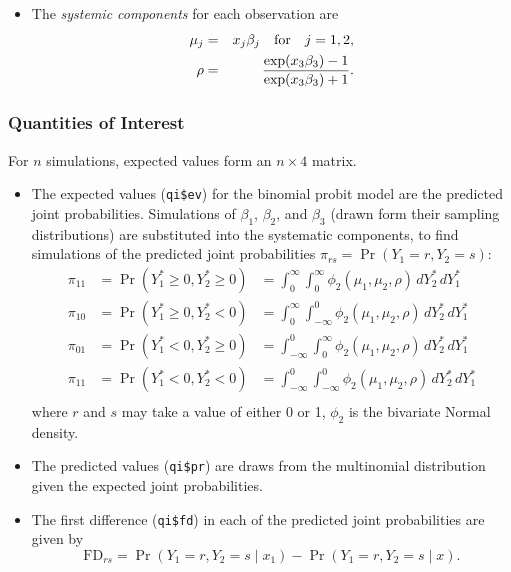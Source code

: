 \documentclass{article}
\begin{document}
\begin{itemize}
\item The \emph{systemic components} for each observation are 
  \begin{eqnarray*}
    \mu_j & = & x_{j} \beta_j \quad {\rm for} \quad j=1,2, \\
    \rho & = & \frac{\exp(x_3 \beta_3) - 1}{\exp(x_3 \beta_3) + 1}.
\end{eqnarray*}

\end{itemize}

\subsubsection{Quantities of Interest}
For $n$ simulations, expected values form an $n \times 4$
matrix.  
\begin{itemize}
\item The expected values ({\tt qi\$ev}) for the binomial probit model
  are the predicted joint probabilities. Simulations of $\beta_1$,
  $\beta_2$, and $\beta_3$ (drawn form their sampling distributions)
  are substituted into the systematic components, to find simulations
  of the predicted joint probabilities $\pi_{rs}=\Pr(Y_1=r, Y_2=s)$:
\begin{eqnarray*}
\pi_{11} &= \Pr(Y_1^* \geq 0 , Y_2^* \geq 0) &= \int_0^{\infty}
\int_0^{\infty} \phi_2 (\mu_1, \mu_2, \rho) \, dY_2^*\, dY_1^* \\
\pi_{10} &= \Pr(Y_1^* \geq 0 , Y_2^* < 0)  &= \int_0^{\infty}
\int_{-\infty}^{0} \phi_2 (\mu_1, \mu_2, \rho) \, dY_2^*\, dY_1^*\\
\pi_{01} &= \Pr(Y_1^* < 0 , Y_2^* \geq 0)  &= \int_{-\infty}^{0}
\int_0^{\infty} \phi_2 (\mu_1, \mu_2, \rho) \, dY_2^*\, dY_1^*\\
\pi_{11} &= \Pr(Y_1^* < 0 , Y_2^* < 0)  &= \int_{-\infty}^{0}
\int_{-\infty}^{0} \phi_2 (\mu_1, \mu_2, \rho) \, dY_2^*\, dY_1^*\\
\end{eqnarray*}
where $r$ and $s$ may take a value of either 0 or 1, $\phi_2$ is the
bivariate Normal density.
  
\item The predicted values ({\tt qi\$pr}) are draws from the
  multinomial distribution given the expected joint probabilities.  

\item The first difference ({\tt qi\$fd}) in each of the predicted joint
  probabilities are given by
  $$\textrm{FD}_{rs} = \Pr(Y_1=r, Y_2=s \mid x_1)-\Pr(Y_1=r, Y_2=s
  \mid x).$$
  

\end{itemize}
\end{document}
